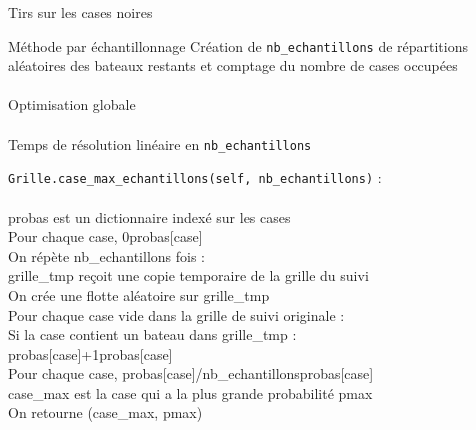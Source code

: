 \begin{frame}{Tirs sur les cases noires}

\end{frame}


\begin{frame}{Méthode par échantillonnage}
Création de \texttt{nb\_echantillons} de répartitions aléatoires des bateaux restants et comptage du nombre de cases occupées\\~\\ \pause
Optimisation globale\\~\\ \pause
Temps de résolution linéaire en \texttt{nb\_echantillons}
\end{frame}

{
\begin{frame}[allowframebreaks]
\texttt{Grille.case\_max\_echantillons(self, nb\_echantillons)} :\\~\\
probas est un dictionnaire indexé sur les cases\\
Pour chaque case, 0\sto probas[case]\\
On répète nb\_echantillons fois :\\
grille\_tmp reçoit une copie temporaire de la grille du suivi\\
On crée une flotte aléatoire sur grille\_tmp\\
Pour chaque case vide dans la grille de suivi originale :\\
Si la case contient un bateau dans grille\_tmp :\\
probas[case]+1\sto probas[case]\\
Pour chaque case, probas[case]/nb\_echantillons\sto probas[case]\\
case\_max est la case qui a la plus grande probabilité pmax\\
On retourne (case\_max, pmax)\\
\end{frame}
}

